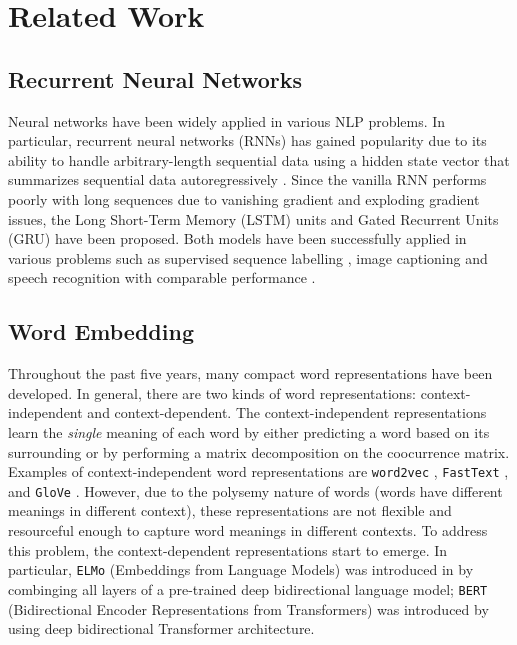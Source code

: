 \section{Related Work}
\label{sec: related_work}

\subsection{Recurrent Neural Networks}
Neural networks have been widely applied in various NLP problems. In particular, recurrent neural networks (RNNs) has gained popularity due to its ability to handle arbitrary-length sequential data using a hidden state vector that summarizes sequential data autoregressively \cite{goodfellow2016}. Since the vanilla RNN performs poorly with long sequences due to vanishing gradient and exploding gradient issues, the Long Short-Term Memory (LSTM) units \cite{hochreiter1997long} and Gated Recurrent Units (GRU) \cite{cho2014properties} have been proposed. Both models have been successfully applied in various problems such as supervised sequence labelling \cite{graves2012supervised}, image captioning \cite{vinyals_2015} and speech recognition \cite{graves2013speech} with comparable performance \cite{yin2017comparative}.

\subsection{Word Embedding}

Throughout the past five years, many compact word representations have been developed. In general, there are two kinds of word representations: context-independent and context-dependent. The context-independent representations learn the \textit{single} meaning of each word by either predicting a word based on its surrounding or by performing a matrix decomposition on the coocurrence matrix. Examples of context-independent word representations are \texttt{word2vec} \cite{mikolov2013efficient}, \texttt{FastText} \cite{bojanowski2017enriching}, and \texttt{GloVe} \cite{pennington2014glove}. However, due to the polysemy nature of words (words have different meanings in different context), these representations are not flexible and resourceful enough to capture word meanings in different contexts. To address this problem, the context-dependent representations start to emerge. In particular, \texttt{ELMo} (Embeddings from Language Models) was introduced in \cite{peters2018deep} by combinging all layers of a pre-trained deep bidirectional language model; \texttt{BERT} (Bidirectional Encoder Representations from Transformers) was introduced by \cite{devlin2018bert} using deep bidirectional Transformer architecture. 

